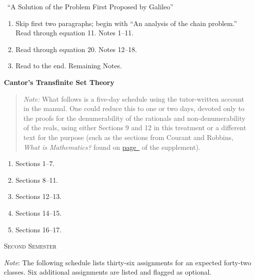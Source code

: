 \documentclass[10pt]{article}
\begin{document}
\ ``A Solution of the Problem First Proposed by
Galileo'' 
\begin{enumerate}[resume*]
	\item Skip first two paragraphs; begin with ``An analysis of the
	chain problem.'' Read through equation 11. Notes
	1--11. 
\item Read through equation 20. Notes
	12--18. \item Read to the end. Remaining
	Notes.
	\end{enumerate} 
\textbf{Cantor's Transfinite Set Theory}
\label{Cantor}
\begin{quote}
	\small{\emph{Note:} What follows is a five-day schedule 
using the tutor-written account 
in the manual. One could reduce this to one or two days,
devoted only to the proofs for the denumerability of
the rationals and non-denumerability of the reals,
using either 
Sections 9 and 12 in this treatment or
a different text for the purpose  (such as
the sections from Courant and Robbins, \emph{What
	is Mathematics?} found on
\hyperref[supple.59]{page~\pageref{supple.59}} of the
supplement).}
\end{quote}
\begin{enumerate}[noitemsep]
	\item Sections 1--7.
	\item Sections 8--11.
	\item Sections 12--13.
	\item Sections 14--15.
	\item Sections 16--17.
\end{enumerate}
\newpage
\begin{center}
	\textsc{\small{Second Semester}}
\end{center}
{\small \emph{Note}: The following schedule lists 
	thirty-six assignments for an expected forty-two
	classes. Six additional
	assignments are listed and flagged as optional.}
\end{document}
